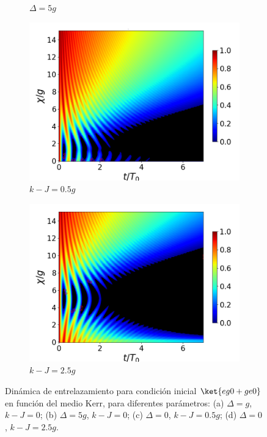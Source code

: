 \begin{figure}[h!]
\begin{subfigure}{0.49\textwidth}
        \caption{$\Delta=5g$}
        \label{fig4:concu x d2}
    \end{subfigure}
    \vfill
    \begin{subfigure}{0.49\textwidth}
        \includegraphics[width=\textwidth]{figuras/ch4/concu/chi/eg0+ge0 d=0.0g k=0.5g J=0.0g gamma=0.25g concu chi dis.png}
        \caption{$k-J=0.5g$}
        \label{fig4:concu x k1}
    \end{subfigure}
    \hfill
    \begin{subfigure}{0.49\textwidth}
        \includegraphics[width=\textwidth]{figuras/ch4/concu/chi/eg0+ge0 d=0.0g k=2.5g J=0.0g gamma=0.25g concu chi dis.png}
        \caption{$k-J=2.5g$}
        \label{fig4:concu x k2}
    \end{subfigure}
    \caption{Dinámica de entrelazamiento para condición inicial $\ket{eg0+ge0}$ en función del medio Kerr, para diferentes parámetros: (a) $\Delta=g$, $k-J=0$; (b) $\Delta=5g$, $k-J=0$; (c) $\Delta=0$, $k-J=0.5g$; (d) $\Delta=0$, $k-J=2.5g$.}
    \label{fig4:concu x params}
\end{figure}
\newpage
